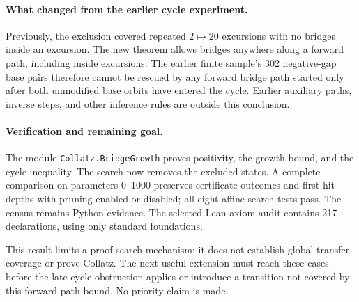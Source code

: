 \documentclass[11pt]{article}
\begin{document}
\paragraph{What changed from the earlier cycle experiment.}
Previously, the exclusion covered repeated $2\mapsto20$ excursions with
no bridges inside an excursion. The new theorem allows bridges anywhere
along a forward path, including inside excursions. The earlier finite
sample's 302 negative-gap base pairs therefore cannot be rescued by any
forward bridge path started only after both unmodified base orbits have
entered the cycle. Earlier auxiliary paths, inverse steps, and other
inference rules are outside this conclusion.

\paragraph{Verification and remaining goal.}
\begingroup\raggedright
The module \texttt{Collatz.BridgeGrowth} proves positivity, the growth bound,
and the cycle inequality. The search now removes the excluded states.
A complete comparison on parameters 0--1000 preserves certificate outcomes
and first-hit depths with pruning enabled or disabled; all eight affine
search tests pass. The census remains Python evidence. The selected Lean
axiom audit contains 217 declarations, using only standard foundations.
\par\endgroup
This result limits a proof-search mechanism; it does not establish global
transfer coverage or prove Collatz. The next useful extension must reach
these cases before the late-cycle obstruction applies or introduce a
transition not covered by this forward-path bound. No priority claim is made.
\end{document}
